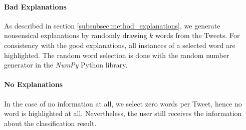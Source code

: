 \paragraph{Bad Explanations}
As described in section \ref{subsubsec:method_explanations}, we generate nonsensical explanations by randomly drawing $k$ words from the Tweets. For consistency with the good explanations, all instances of a selected word are highlighted. The random word selection is done with the random number generator in the \textit{NumPy} Python library.

\paragraph{No Explanations}
In the case of no information at all, we select zero words per Tweet, hence no word is highlighted at all. Nevertheless, the user still receives the information about the classification result.



